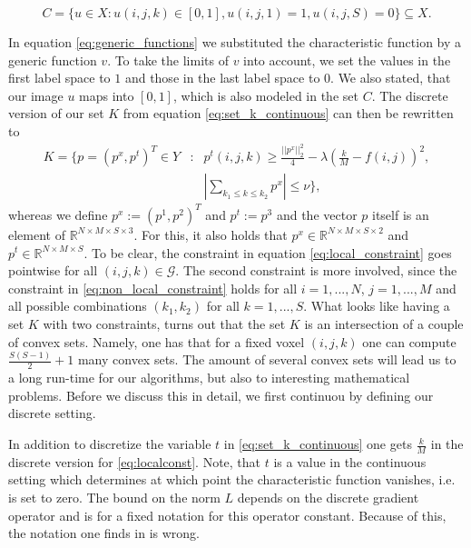         \begin{equation}
            C = \{ u \in X: u(i,j,k) \in [0,1], u(i, j, 1) = 1, u(i, j, S) = 0 \} \subseteq X.
        \end{equation}

    In equation \ref{eq:generic_functions} we substituted the characteristic function by a generic function $v$. To take the limits of $v$ into account, we set the values in the first label space to $1$ and those in the last label space to $0$. We also stated, that our image $u$ maps into $[0, 1]$, which is also modeled in the set $C$.
    The discrete version of our set $K$ from equation \ref{eq:set_k_continuous} can then be rewritten to
        \begin{eqnarray}
            K = \{ p = (p^{x}, p^{t})^{T} \in Y &:& p^{t}(i,j,k) \ge \frac{||p^{x}||_{2}^{2}}{4} - \lambda(\frac{k}{M} - f(i,j))^{2}, \label{eq:local_constraint} \\
            &&\left| \sum_{k_{1} \le k \le k_{2}} p^{x} \right| \le \nu \}, \label{eq:non_local_constraint}
        \end{eqnarray}
    whereas we define $p^{x} := (p^{1}, p^{2})^{T}$ and $p^{t} := p^{3}$ and the vector $p$ itself is an element of $\mathbb{R}^{N \times M \times S \times 3}$. For this, it also holds that $p^{x} \in \mathbb{R}^{N \times M \times S \times 2}$ and $p^{t} \in \mathbb{R}^{N \times M \times S}$. To be clear, the constraint in equation \ref{eq:local_constraint} goes pointwise for all $(i, j, k) \in \mathcal{G}$. The second constraint is more involved, since the constraint in \ref{eq:non_local_constraint} holds for all $i = 1, ..., N$, $j = 1, ..., M$ and all possible combinations $(k_{1}, k_{2})$ for all $k = 1, ..., S$. What looks like having a set $K$ with two constraints, turns out that the set $K$ is an intersection of a couple of convex sets. Namely, one has that for a fixed voxel $(i, j, k)$ one can compute $\frac{S (S - 1)}{2} + 1$ many convex sets. The amount of several convex sets will lead us to a long run-time for our algorithms, but also to interesting mathematical problems. Before we discuss this in detail, we first continuou by defining our discrete setting.

    \begin{remark}
        In addition to discretize the variable $t$ in \ref{eq:set_k_continuous} one gets $\frac{k}{M}$ in the discrete version for \ref{eq:localconst}. Note, that $t$ is a value in the continuous setting which determines at which point the characteristic function vanishes, i.e. is set to zero. The bound on the norm $L$ depends on the discrete gradient operator and is for a fixed notation for this operator constant. Because of this, the notation one finds in \cite{Pock-et-al-iccv09} is wrong.
    \end{remark}

